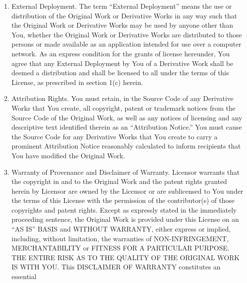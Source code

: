 \begin{small}
\begin{enumerate}[1)]
grant any rights to trademarks, copyrights, patents, trade secrets or
any other intellectual property of Licensor except as expressly stated
herein. No patent license is granted to make, use, sell or offer to
sell embodiments of any patent claims other than the licensed claims
defined in Section 2. No right is granted to the trademarks of
Licensor even if such marks are included in the Original Work. Nothing
in this License shall be interpreted to prohibit Licensor from
licensing under different terms from this License any Original Work
that Licensor otherwise would have a right to license.
\item
External Deployment. The term ``External Deployment'' means the use or
distribution of the Original Work or Derivative Works in any way such
that the Original Work or Derivative Works may be used by anyone other
than You, whether the Original Work or Derivative Works are
distributed to those persons or made available as an application
intended for use over a computer network. As an express condition for
the grants of license hereunder, You agree that any External
Deployment by You of a Derivative Work shall be deemed a distribution
and shall be licensed to all under the terms of this License, as
prescribed in section 1(c) herein.
\item
Attribution Rights. You must retain, in the Source Code of any
Derivative Works that You create, all copyright, patent or trademark
notices from the Source Code of the Original Work, as well as any
notices of licensing and any descriptive text identified therein as an
``Attribution Notice.'' You must cause the Source Code for any
Derivative Works that You create to carry a prominent Attribution
Notice reasonably calculated to inform recipients that You have
modified the Original Work.
\item
Warranty of Provenance and Disclaimer of Warranty. Licensor warrants
that the copyright in and to the Original Work and the patent rights
granted herein by Licensor are owned by the Licensor or are
sublicensed to You under the terms of this License with the permission
of the contributor(s) of those copyrights and patent rights. Except as
expressly stated in the immediately proceeding sentence, the Original
Work is provided under this License on an ``AS IS'' BASIS and WITHOUT
WARRANTY, either express or implied, including, without limitation,
the warranties of NON-INFRINGEMENT, MERCHANTABILITY or FITNESS FOR A
PARTICULAR PURPOSE. THE ENTIRE RISK AS TO THE QUALITY OF THE ORIGINAL
WORK IS WITH YOU. This DISCLAIMER OF WARRANTY constitutes an essential

\end{enumerate}
\end{small}
